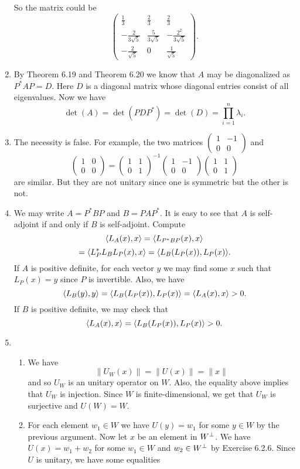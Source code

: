 \begin{enumerate}
So the matrix could be 
\[\begin{pmatrix}\frac{1}{3}&\frac{2}{3}&\frac{2}{3}\\-\frac{2}{3\sqrt{5}}&\frac{5}{3\sqrt{5}}&-\frac{{2}^{2}}{3\sqrt{5}}\\-\frac{2}{\sqrt{5}}&0&\frac{1}{\sqrt{5}}\end{pmatrix}.\]
\item By Theorem 6.19 and Theorem 6.20 we know that $A$ may be diagonalized as $P^*AP=D$. Here $D$ is a diagonal matrix whose diagonal entries consist of all eigenvalues. Now we have 
\[\det(A)=\det(PDP^*)=\det(D)=\prod_{i=1}^n{\lambda_i}.\]
\item The necessity is false. For example, the two matrices $\begin{pmatrix}1&-1\\0&0\end{pmatrix}$ and 
\[\begin{pmatrix}1&0\\0&0\end{pmatrix}=\begin{pmatrix}1&1\\0&1\end{pmatrix}^{-1}\begin{pmatrix}1&-1\\0&0\end{pmatrix}\begin{pmatrix}1&1\\0&1\end{pmatrix}\]
are similar. But they are not unitary since one is symmetric but the other is not.
\item We may write $A=P^*BP$ and $B = PAP^*$.  It is easy to see that $A$ is self-adjoint if and only if $B$ is self-adjoint.  Compute 
\[\langle L_A(x),x\rangle =\langle L_{P^*BP}(x),x\rangle \]
\[=\langle L_{P}^*L_BL_P(x),x\rangle =\langle L_B(L_P(x)),L_P(x)\rangle .\]
If $A$ is positive definite, for each vector $y$ we may find some $x$ such that $L_P(x)=y$ since $P$ is invertible. Also, we have 
\[\langle L_B(y),y\rangle =\langle L_B(L_P(x)),L_P(x)\rangle =\langle L_A(x),x\rangle >0.\]
If $B$ is positive definite, we may check that 
\[\langle L_A(x),x\rangle = \langle L_B(L_P(x)),L_P(x)\rangle >0.\]
\item \begin{enumerate}
\item We have 
\[\|U_W(x)\|=\|U(x)\|=\|x\|\]
and so $U_W$ is an unitary operator on $W$. Also, the equality above implies that $U_W$ is injection. Since $W$ is finite-dimensional, we get that $U_W$ is surjective and $U(W)=W$.
\item For each element $w_1\in W$ we have $U(y)=w_1$ for some $y\in W$ by the previous argument. Now let $x$ be an element in $W^{\perp}$. We have $U(x)=w_1+w_2$ for some $w_1\in W$ and $w_2\in W^{\perp}$ by Exercise 6.2.6. Since $U$ is unitary, we have some equalities 

\end{enumerate}
\end{enumerate}
